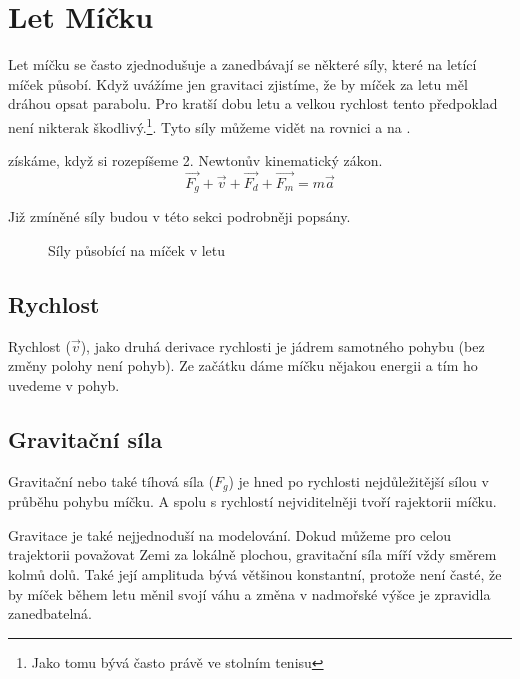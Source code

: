 \section{Let Míčku}
\label{ssec:let-micku}
Let míčku se často zjednodušuje a zanedbávají se některé síly, které na letící
míček působí. Když uvážíme jen gravitaci zjistíme, že by míček za letu měl
dráhou opsat parabolu. Pro kratší dobu letu a velkou rychlost tento předpoklad
není nikterak škodlivý.\footnote{Jako tomu bývá často právě ve stolním tenisu}.
Tyto síly můžeme vidět na rovnici  a na
.

 získáme, když si rozepíšeme 2. Newtonův kinematický
zákon. 
\begin{equation}
 \label{eq:Newton}
  \vec{F_g} + \vec{v} + \vec{F_d} + \vec{F_m} = m \vec{a}
\end{equation}

Již zmíněné síly budou v této sekci podrobněji popsány.

\begin{figure}[htbp]
 \centering
 

 \caption{Síly působící na míček v letu}
 \label{fig:let-micku}
\end{figure}


\subsection{Rychlost}
\label{ssec:rychlost}
Rychlost ($\vec{v}$), jako druhá derivace rychlosti je jádrem samotného pohybu
(bez změny polohy není pohyb). Ze začátku dáme míčku nějakou energii a tím ho
uvedeme v pohyb.


\subsection{Gravitační síla}
\label{ssec:gravitacni-sila}

Gravitační nebo také tíhová síla ($F_g$) je hned po rychlosti nejdůležitější sílou v
průběhu pohybu míčku. A spolu s rychlostí nejviditelněji tvoří rajektorii míčku.

Gravitace je také nejjednoduší na modelování. Dokud můžeme pro celou trajektorii
považovat Zemi za lokálně plochou, gravitační síla míří vždy směrem kolmů dolů.
Také její amplituda bývá většinou konstantní, protože není časté, že by míček
během letu měnil svojí váhu a změna v nadmořské výšce je zpravidla zanedbatelná.

